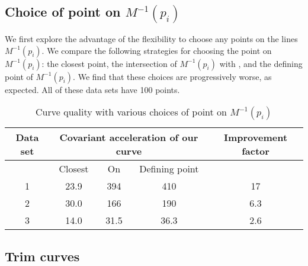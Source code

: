 \subsection{Choice of point on $M^{-1}(p_i)$}

We first explore the advantage of the flexibility 
to choose any points on the lines $M^{-1}(p_i)$.
We compare the following strategies for choosing the point on $M^{-1}(p_i)$:
the closest point,
the intersection of $M^{-1}(p_i)$ with , and
the defining point of $M^{-1}(p_i)$.
We find that these choices are progressively worse, as expected.
All of these data sets have 100 points.

\begin{table}[h]
\begin{tabular}{|c|c|c|c|c|}  	\hline
Data set & \multicolumn{3}{c|}{Covariant acceleration of our curve} & Improvement factor\\ \hline
	 & Closest & On \Sn{3} & Defining point & \\ \hline
1 & 23.9 & 394   & 410   &  17  \\ \hline
2 & 30.0 & 166   & 190	 &  6.3 \\ \hline
3 & 14.0 & 31.5  & 36.3  &  2.6 \\ \hline
\end{tabular}
\caption{Curve quality with various choices of point on $M^{-1}(p_i)$}
\label{tab:cov}
\end{table}

\subsection{Trim curves}

